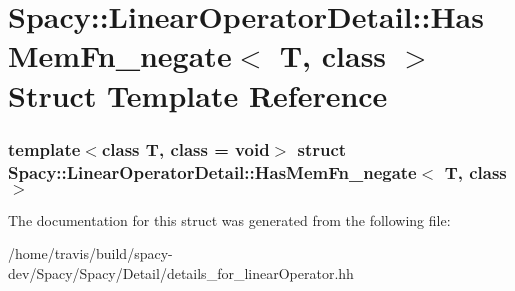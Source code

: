 \hypertarget{structSpacy_1_1LinearOperatorDetail_1_1HasMemFn__negate}{\section{\-Spacy\-:\-:\-Linear\-Operator\-Detail\-:\-:\-Has\-Mem\-Fn\-\_\-negate$<$ \-T, class $>$ \-Struct \-Template \-Reference}
\label{structSpacy_1_1LinearOperatorDetail_1_1HasMemFn__negate}
}
\subsubsection*{template$<$class T, class = void$>$ struct Spacy\-::\-Linear\-Operator\-Detail\-::\-Has\-Mem\-Fn\-\_\-negate$<$ T, class $>$}



\-The documentation for this struct was generated from the following file\-:\begin{DoxyCompactItemize}
\item 
/home/travis/build/spacy-\/dev/\-Spacy/\-Spacy/\-Detail/details\-\_\-for\-\_\-linear\-Operator.\-hh\end{DoxyCompactItemize}
